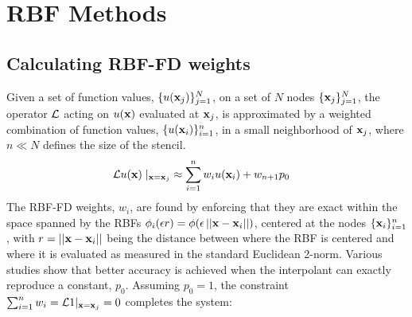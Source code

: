 

\chapter{RBF Methods}

\section{Calculating RBF-FD weights}
\label{sec:rbffd}

Given a set of function values, $\{u(\mathbf{x}_j)\}_{j=1}^{N}$, on a set of $N$ nodes $\{\mathbf{x}_j\}_{j=1}^{N}$, the operator $\diffop$ acting on $u(\mathbf{x})$ evaluated at 
$\mathbf{x}_j$, %
is approximated by a weighted combination of function values, $\{u(\mathbf{x}_i)\}_{i=1}^{n}$, in a small neighborhood of $\mathbf{x}_j$, 
where $n\ll N$ defines the size of the stencil. 
\begin{align}
\mathcal{L}u(\mathbf{x})\mid_{\mathbf{x}=\mathbf{x}_j} &\approx \sum_{i=1}^{n} w_i u(\mathbf{x}_i) + w_{n+1} p_0
\label{eq:derivFromFDWeights}
\end{align}
The RBF-FD weights, ${w_i}$, are found by enforcing that they are exact within the space spanned by the RBFs $\phi_i(\epsilon r) = \phi(\epsilon\left|\left|\mathbf{x}-\mathbf{x}_{i}\right|\right|)$, centered at the nodes $\{\mathbf{x}_i\}_{i=1}^{n}$, with 
$r=\left|\left|\mathbf{x} - \mathbf{x}_i\right|\right|$
being the distance between where the RBF is centered and where it is evaluated as measured in the standard Euclidean 2-norm. Various studies show  \cite{WrightFornberg06,FornbergDriscoll02,FornbergLehto11,FlyerLehto11} that better accuracy is achieved when the 
interpolant can exactly reproduce a constant, $p_0$.  
Assuming $p_0 = 1$, the constraint $\sum_{i=1}^{n}w_i=\mathcal{L}1|_{\mathbf{x}=\mathbf{x}_{j}}=0$ completes the system: 
